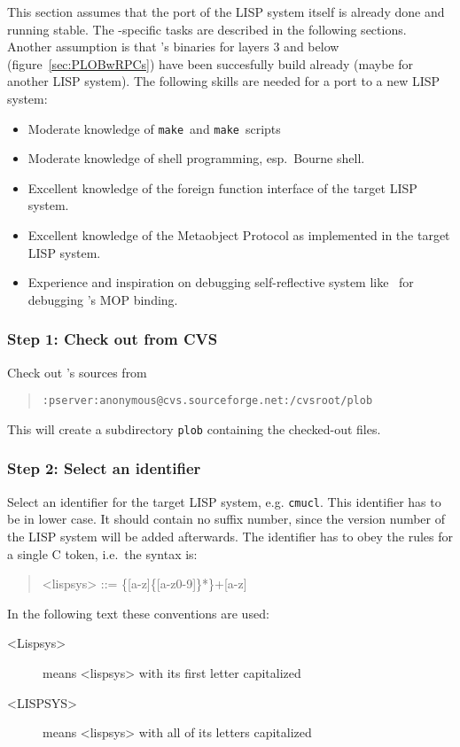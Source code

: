 This section assumes that the port of the LISP system itself is
already done and running stable. The \plob-specific tasks are
described in the following sections. Another assumption is that
\plob's binaries for layers 3 and below (figure~\ref{sec:PLOBwRPCs})
have been succesfully build already (maybe for another LISP system).
The following skills are needed for a port to a new LISP system:

\begin{itemize}

\item Moderate knowledge of \texttt{make}\ and \texttt{make}\ scripts

\item Moderate knowledge of shell programming, esp.\ Bourne shell.

\item Excellent knowledge of the foreign function interface of the
  target LISP system.

\item Excellent knowledge of the Metaobject Protocol as implemented in
  the target LISP system.

\item Experience and inspiration on debugging self-reflective system
  like \clos\ for debugging \plob's MOP binding.

\end{itemize}

\subsubsection{Step 1: Check out from CVS}

Check out \plob's sources from
\begin{quotation}
\texttt{:pserver:anonymous@cvs.sourceforge.net:/cvsroot/plob}
\end{quotation}
This will create a subdirectory \texttt{plob} containing the
checked-out files.

\subsubsection{Step 2: Select an identifier}

Select an identifier for the target LISP system, e.g. \texttt{cmucl}.
This identifier has to be in lower case. It should contain no suffix
number, since the version number of the LISP system will be added
afterwards.  The identifier has to obey the rules for a single C
token, i.e.\ the syntax is:
\begin{quotation}
<lispsys> ::= \{[a-z]\{[a-z0-9]\}*\}+[a-z]
\end{quotation}
In the following text these conventions are used:
\begin{description}

\item[<Lispsys>] means <lispsys> with its first letter capitalized

\item[<LISPSYS>] means <lispsys> with all of its letters capitalized

\end{description}

